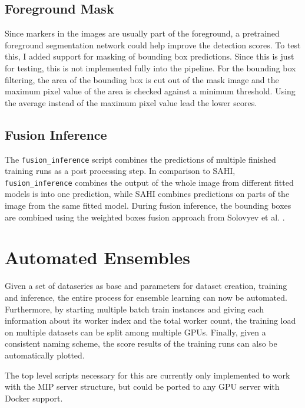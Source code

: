 \documentclass[10pt]{book}
\begin{document}
\subsection{Foreground Mask}

Since markers in the images are usually part of the foreground, a pretrained foreground segmentation network could help improve the detection scores.
To test this, I added support for masking of bounding box predictions. Since this is just for testing, this is not implemented fully into the pipeline. For the bounding box filtering, the area of the bounding box is cut out of the mask image and the maximum pixel value of the area is checked against a minimum threshold. Using the average instead of the maximum pixel value lead the lower scores.

\subsection{Fusion Inference}

The \texttt{fusion\_inference} script combines the predictions of multiple finished training runs as a post processing step. In comparison to \ac{SAHI}, \texttt{fusion\_inference} combines the output of the whole image from different fitted models is into one prediction, while \ac{SAHI} combines predictions on parts of the image from the same fitted model. During fusion inference, the bounding boxes are combined using the weighted boxes fusion approach from Solovyev et al. \cite{solovyev2021weighted}.


\section{Automated Ensembles}

Given a set of dataseries as base and parameters for dataset creation, training and inference, the entire process for ensemble learning can now be automated. Furthermore, by starting multiple batch train instances and giving each information about its worker index and the total worker count, the training load on multiple datasets can be split among multiple \acp{GPU}. Finally, given a consistent naming scheme, the score results of the training runs can also be automatically plotted.

The top level scripts necessary for this are currently only implemented to work with the \ac{MIP} server structure, but could be ported to any \ac{GPU} server with Docker support.
\end{document}
